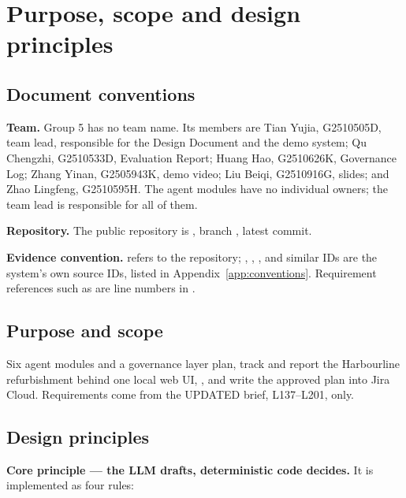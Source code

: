 \chapter{Purpose, scope and design principles}
\label{ch:purpose}

\section{Document conventions}
\label{sec:conventions}

\noindent\textbf{Team.} Group 5 has no team name. Its members are Tian Yujia, G2510505D, team lead, responsible for the Design Document and the demo system; Qu Chengzhi, G2510533D, Evaluation Report; Huang Hao, G2510626K, Governance Log; Zhang Yinan, G2505943K, demo video; Liu Beiqi, G2510916G, slides; and Zhao Lingfeng, G2510595H. The agent modules have no individual owners; the team lead is responsible for all of them.\par\smallskip

\noindent\textbf{Repository.} The public repository is , branch , latest commit.\par\smallskip

\noindent\textbf{Evidence convention.}  refers to the repository; , , ,  and similar IDs are the system's own source IDs, listed in Appendix~\ref{app:conventions}. Requirement references such as  are line numbers in .

\section{Purpose and scope}

Six agent modules and a governance layer plan, track and report the Harbourline refurbishment behind one local web UI, , and write the approved plan into Jira Cloud. Requirements come from the UPDATED brief, L137--L201, only.

\section{Design principles}
\label{sec:principles}

\textbf{Core principle --- the LLM drafts, deterministic code decides.} It is implemented as four rules:

